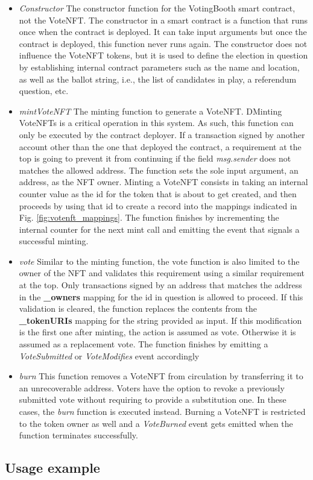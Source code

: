 \documentclass[../main.tex]{subfiles}
\begin{document}
\begin{itemize}
    \item {\textit{Constructor} The constructor function for the VotingBooth smart contract, not the VoteNFT. The constructor in a smart contract is a function that runs once when the contract is deployed. It can take input arguments but once the contract is deployed, this function never runs again. The constructor does not influence the VoteNFT tokens, but it is used to define the election in question by establishing internal contract parameters such as the name and location, as well as the ballot string, i.e., the list of candidates in play, a referendum question, etc.}
    \item {\textit{mintVoteNFT} The minting function to generate a VoteNFT. DMinting VoteNFTs is a critical operation in this system. As such, this function can only be executed by the contract deployer. If a transaction signed by another account other than the one that deployed the contract, a requirement at the top is going to prevent it from continuing if the field \textit{msg.sender} does not matches the allowed address. The function sets the sole input argument, an address, as the NFT owner. Minting a VoteNFT consists in taking an internal counter value as the id for the token that is about to get created, and then proceeds by using that id to create a record into the mappings indicated in Fig. \ref{fig:votenft_mappings}. The function finishes by incrementing the internal counter for the next mint call and emitting the event that signals a successful minting.}
    \item {\textit{vote} Similar to the minting function, the vote function is also limited to the owner of the NFT and validates this requirement using a similar requirement at the top. Only transactions signed by an address that matches the address in the \textbf{\_owners} mapping for the id in question is allowed to proceed. If this validation is cleared, the function replaces the contents from the \textbf{\_tokenURIs} mapping for the string provided as input. If this modification is the first one after minting, the action is assumed as vote. Otherwise it is assumed as a replacement vote. The function finishes by emitting a \textit{VoteSubmitted} or \textit{VoteModifies} event accordingly}
    \item {\textit{burn} This function removes a VoteNFT from circulation by transferring it to an unrecoverable address. Voters have the option to revoke a previously submitted vote without requiring to provide a substitution one. In these cases, the \textit{burn} function is executed instead. Burning a VoteNFT is restricted to the token owner as well and a \textit{VoteBurned} event gets emitted when the function terminates successfully.}
\end{itemize}

\subsection{Usage example}


\end{document}
